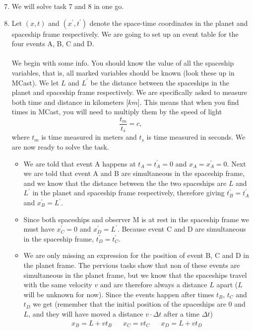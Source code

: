 \documentclass[a4paper,10pt,english]{article}
\begin{document}
\begin{enumerate}
\setcounter{enumi}{6}
\item We will solve task 7 and 8 in one go.
\item Let $(x,t)$ and $(x^{\prime},t^{\prime})$ denote the space-time coordinates in the planet and spaceship frame respectively. We are going to set up an event table for the four events A, B, C and D.
\\ \\
We begin with some info. You should know the value of all the spaceship variables, that is, all marked variables should be known (look these up in MCast). We let $L$ and $L^{\prime}$ be the distance between the spaceships in the planet and spaceship frame respectively. We are specifically asked to measure both time and distance in kilometers [$km$]. This means that when you find times in MCast, you will need to multiply them by the speed of light \[\frac{t_{m}}{t_{s}}=c,\] where $t_{m}$ is time measured in meters and $t_{s}$ is time measured in seconds. We are now ready to solve the task.
\\ 
\begin{itemize}
\item We are told that event A happens at $t_{A}=t_{A}^{\prime}=0$ and $x_{A}=x_{A}^{\prime}=0$. Next we are told that event A and B are simultaneous in the spaceship frame, and we know that the distance between the the two spaceships are $L$ and $L^{\prime}$ in the planet and spaceship frame respectively, therefore giving $t_{B}^{\prime}=t^{\prime}_{A}$ and $x_{B}^{\prime}=L^{\prime}$.
\item Since both spaceships and observer M is at rest in the spaceship frame we must have $x_{C}^{\prime}=0$ and $x^{\prime}_{D}=L^{\prime}$. Because event C and D are simultaneous in the spaceship frame, $t^{\prime}_{D}=t^{\prime}_{C}$.
\item We are only missing an expression for the position of event B, C and D in the planet frame. The pervious tasks show that non of these events are simultaneous in the planet frame, but we know that the spaceships travel with the same velocity $v$ and are therefore always a distance $L$ apart ($L$ will be unknown for now). Since the events happen after times $t_{B}$, $t_{C}$ and $t_{D}$ we get (remember that the initial position of the spaceships are $0$ and $L$, and they will have moved a distance $v\cdot \Delta t$ after a time $\Delta t$) 
\begin{align*}
x_{B}=L+vt_{B} && x_{C}=vt_{C} && x_{D}=L+vt_{D}
\end{align*}
\end{itemize}


\end{enumerate}
\end{document}
